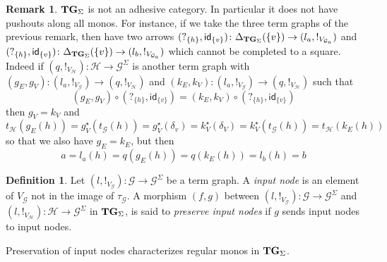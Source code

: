 \documentclass[a4paper,UKenglish,cleveref,pdftex,amsthm,thm-restate,numberwithinsect]{cas-sc}
\theoremstyle{plain}
\newtheorem{proposition}[theorem]{Proposition}
\theoremstyle{definition}
\newtheorem{definition}[theorem]{Definition}
\newtheorem{remark}[theorem]{Remark}
\newcommand{\catname}[1]{\textbf{\textup{#1}}}
\newcommand{\tg}[0]{\catname{TG}_{\Sigma}}
\newcommand{\commentato}[1]{ {} }
\newcommand{\id}[1]{\mathsf{id}_{#1}}
\begin{document}
{\begin{remark}
	$\tg$ is not an adhesive category. In particular it does not have pushouts along all monos. For instance, if we take the three term graphs of the previous remark, then have two arrows
	$(?_{\{h\}}, \id{\{v\}})\colon \Delta_{\tg}(\{v\})\to (l_a, !_{V_{\mathcal{G}_a}})$ and $(?_{\{h\}}, \id{\{v\}})\colon \Delta_{\tg}(\{v\})\to (l_b, !_{V_{\mathcal{G}_a}})$ which cannot be completed to a square. Indeed if $(q, !_{V_\mathcal{H}})\colon \mathcal{H}\to \mathcal{G}^\Sigma$ is another term graph with $(g_E, g_V)\colon (l_a, !_{V_{\mathcal{G}}})\to (q, !_{V_\mathcal{H}})$ and $(k_E, k_V)\colon (l_a, !_{V_{\mathcal{G}}})\to (q, !_{V_\mathcal{H}})$  such that 
	\[(g_E, g_V)\circ (?_{\{h\}}, \id{\{v\}}) = (k_E, k_V)\circ (?_{\{h\}}, \id{\{v\}})\]
	then $g_V=k_V$ and
	\[t_{\mathcal{H}}(g_E(h))=g^\star_V(t_{\mathcal{G}}(h))=g_V^\star(\delta_v)=k^\star_V(\delta_V)=k^\star_V(t_{\mathcal{G}}(h))=t_{\mathcal{H}}(k_E(h))\]
	so that we also have $g_E=k_E$, but then
	\[
	a=l_a(h)=q(g_E(h))=q(k_E(h))=l_b(h)=b\]
\end{remark}
}

\begin{definition}
	Let $(l, !_{V_{\mathcal{G}}})\colon \mathcal{G}\to \mathcal{G}^{\Sigma}$  be a term graph. A \emph{input node} is an element of $V_{\mathcal{G}}$ not in the image of $\tau_{\mathcal{G}}$.  A morphism $(f,g)$ between
	 $(l, !_{V_{\mathcal{G}}})\colon \mathcal{G}\to \mathcal{G}^{\Sigma}$ and $(l, !_{V_{\mathcal{H}}})\colon \mathcal{H}\to \mathcal{G}^{\Sigma}$ in $\tg$, is said to \emph{preserve input nodes} if $g$ sends input nodes to input nodes.
\end{definition}

\commentato{
\todo{Se questo remark sotto non serve nel pezzo sulle equivalenze possiamo toglierlo}
\begin{remark}\label{prop:image}
	Suppose that $(f,g)\colon (l, !_{V_{\mathcal{G}}})\to (l', !_{V_{\mathcal{H}}})$ preserves input nodes. Then  if $\tau_{\mathcal{H}}(h)=g(v)$ for some $v\in V_{\mathcal{G}}$ then $h$ belongs to the image of $f$. Indeed, by hypothesis $v$ must be in the image of $\tau_{\mathcal{G}}$ and so there exists $k$ such that $\tau_{\mathcal{G}}(k)=v$. But then $\tau_{\mathcal{H}}(f(k))=g(v)$ and we can conclude that $f(k)=h$.
\end{remark}
}

Preservation of input nodes characterizes regular monos in $\tg$.

\end{document}
